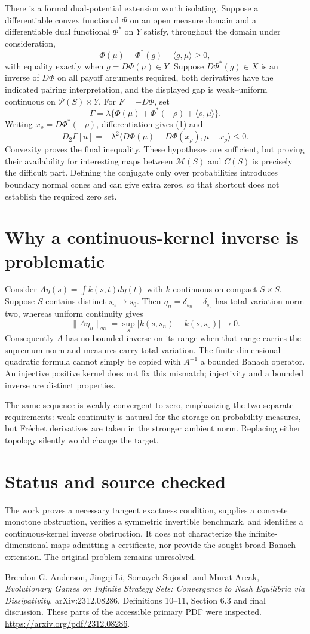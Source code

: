 \documentclass[11pt]{article}
\begin{document}
There is a formal dual-potential extension worth isolating. Suppose a differentiable convex functional $\Phi$ on an open measure domain and a differentiable dual functional $\Phi^*$ on $Y$ satisfy, throughout the domain under consideration,
\[
 \Phi(\mu)+\Phi^*(g)-\langle g,\mu\rangle\geq0,
\]
with equality exactly when $g=D\Phi(\mu)\in Y$. Suppose $D\Phi^*(g)\in X$ is an inverse of $D\Phi$ on all payoff arguments required, both derivatives have the indicated pairing interpretation, and the displayed gap is weak--uniform continuous on $\mathcal P(S)\times Y$. For $F=-D\Phi$, set
\[
 \Gamma=\lambda\{\Phi(\mu)+\Phi^*(-\rho)+\langle\rho,\mu\rangle\}.
\]
Writing $x_\rho=D\Phi^*(-\rho)$, differentiation gives (1) and
\[
 D_2\Gamma[u]
 =-\lambda^2\langle D\Phi(\mu)-D\Phi(x_\rho),\mu-x_\rho\rangle\leq0.
\]
Convexity proves the final inequality. These hypotheses are sufficient, but proving their availability for interesting maps between $\mathcal M(S)$ and $C(S)$ is precisely the difficult part. Defining the conjugate only over probabilities introduces boundary normal cones and can give extra zeros, so that shortcut does not establish the required zero set.

\section*{Why a continuous-kernel inverse is problematic}
Consider $A\eta(s)=\int k(s,t)d\eta(t)$ with $k$ continuous on compact $S\times S$. Suppose $S$ contains distinct $s_n\to s_0$. Then $\eta_n=\delta_{s_n}-\delta_{s_0}$ has total variation norm two, whereas uniform continuity gives
\[
 \|A\eta_n\|_\infty
 =\sup_s|k(s,s_n)-k(s,s_0)|\longrightarrow0.
\]
Consequently $A$ has no bounded inverse on its range when that range carries the supremum norm and measures carry total variation. The finite-dimensional quadratic formula cannot simply be copied with $A^{-1}$ a bounded Banach operator. An injective positive kernel does not fix this mismatch; injectivity and a bounded inverse are distinct properties.

The same sequence is weakly convergent to zero, emphasizing the two separate requirements: weak continuity is natural for the storage on probability measures, but Fr\'echet derivatives are taken in the stronger ambient norm. Replacing either topology silently would change the target.

\section*{Status and source checked}
The work proves a necessary tangent exactness condition, supplies a concrete monotone obstruction, verifies a symmetric invertible benchmark, and identifies a continuous-kernel inverse obstruction. It does not characterize the infinite-dimensional maps admitting a certificate, nor provide the sought broad Banach extension. The original problem remains unresolved.

Brendon G. Anderson, Jingqi Li, Somayeh Sojoudi and Murat Arcak, \emph{Evolutionary Games on Infinite Strategy Sets: Convergence to Nash Equilibria via Dissipativity}, arXiv:2312.08286, Definitions 10--11, Section 6.3 and final discussion. These parts of the accessible primary PDF were inspected. \url{https://arxiv.org/pdf/2312.08286}.
\end{document}
